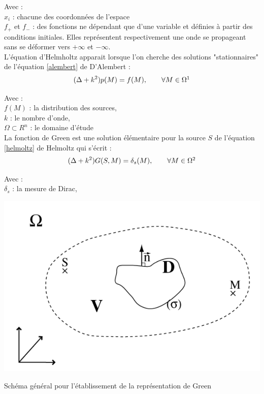 Avec : \\
$x_i$ : chacune des coordonnées de l'espace\\
$ f_+$ et  $f_-$ : des fonctions ne dépendant que d'une variable et définies à partir des conditions initiales. Elles représentent respectivement une onde se propageant sans se déformer vers $+\infty$ et $-\infty$.\\

L'équation d'Helmholtz apparait lorsque l'on cherche des solutions "stationnaires" de l'équation \ref{alembert} de D'Alembert :
\begin{equation} \label{helmoltz}
(\Delta + k^2)p(M) = f(M),	 	\qquad  \forall M  \in \Omega
\footnotemark
\end{equation}

Avec : \\
$f(M)$ : la distribution des sources, \\
$k$ : le nombre d'onde, \\
$\Omega  \subset R^n$ : le domaine d'étude\\

La fonction de Green est une solution élémentaire pour la source $S$ de l'équation \ref{helmoltz} de Helmoltz qui s'écrit :
\begin{equation} \label{green}
(\Delta + k^2)G(S,M) = \delta_s(M),	 	\qquad  \forall M  \in \Omega
\footnotemark
\end{equation}

Avec : \\
$\delta_s$ : la mesure de \gls{Dirac}, \\

\begin{figureth}
	\includegraphics[width=0.6\linewidth]{images/green}
	\caption[Schéma général pour l'établissement de la représentation de Green]{Schéma général pour l'établissement de la représentation de Green \footnotemark}
\end{figureth}

